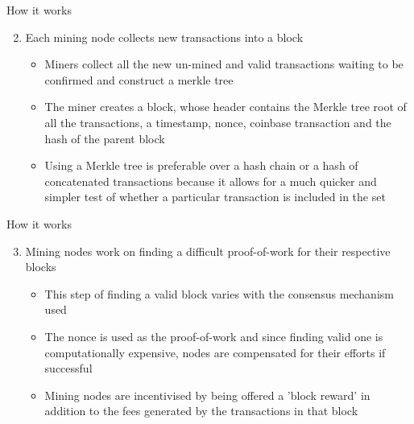 \documentclass[9pt]{beamer}
\begin{document}
\begin{frame}{How it works}
	\begin{enumerate}
		\setcounter{enumi}{1}
		\item Each mining node collects new transactions into a block
		\begin{itemize}
			\item Miners collect all the new un-mined and valid transactions waiting to be confirmed and construct a merkle tree
			\item The miner creates a block, whose header contains the Merkle tree root of all the transactions, a timestamp, nonce, coinbase transaction and the hash of the parent block
			\item Using a Merkle tree is preferable over a hash chain or a hash of concatenated transactions because it allows for a much quicker and simpler test of whether a particular transaction is included in the set
		\end{itemize}
	\end{enumerate}
\end{frame}


\begin{frame}{How it works}
	\begin{enumerate}
		\setcounter{enumi}{2}
		\item Mining nodes work on finding a difficult proof-of-work for their respective blocks
		\begin{itemize}
			\item This step of finding a valid block varies with the consensus mechanism used
			\item The nonce is used as the proof-of-work and since finding valid one is computationally expensive, nodes are compensated for their efforts if successful
			\item Mining nodes are incentivised by being offered a 'block reward' in addition to the fees generated by the transactions in that block
		\end{itemize}
	\end{enumerate}
\end{frame}

\end{document}
